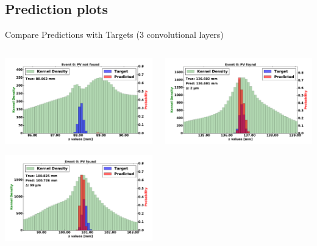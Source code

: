 \subsection{Prediction plots}

\begin{frame}{Compare Predictions with Targets (3 convolutional layers)}
  \begin{columns}[c]
        \begin{center}
            \includegraphics[width=1\textwidth,height=0.45\textwidth, trim=18 0 18 0]{images/120000_3layer_00.pdf}
    
            \includegraphics[width=1\textwidth, height=0.45\textwidth,trim=18 0 18 0]{images/120000_3layer_01.pdf}

        \end{center}
        \begin{center}
           \includegraphics[width=1\textwidth, height=0.45\textwidth, trim=18 0 18 0]{images/120000_3layer_02.pdf}
    

\end{center}
\end{columns}
\end{frame}
